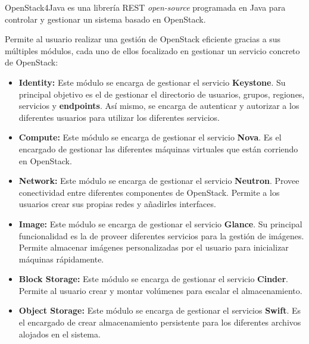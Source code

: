 OpenStack4Java\cite{openstack4jbib} es una librería REST \textit{open-source} programada en Java para controlar y gestionar un sistema basado en OpenStack.

Permite al usuario realizar una gestión de OpenStack eficiente gracias a sus múltiples módulos, cada uno de ellos focalizado en gestionar un servicio concreto de OpenStack:

\begin{itemize}
	\item \textbf{Identity:} Este módulo se encarga de gestionar el servicio \textbf{Keystone}. Su principal objetivo es el de gestionar el directorio de usuarios, grupos, regiones, servicios y \textbf{endpoints}. Así mismo, se encarga de autenticar y autorizar a los diferentes usuarios para utilizar los diferentes servicios.
	
	\item \textbf{Compute:} Este módulo se encarga de gestionar el servicio \textbf{Nova}. Es el encargado de gestionar las diferentes máquinas virtuales que están corriendo en OpenStack.
	
	\item \textbf{Network:} Este módulo se encarga de gestionar el servicio \textbf{Neutron}. Provee conectividad entre diferentes componentes de OpenStack. Permite a los usuarios crear sus propias redes y añadirles interfaces.
	
	\item \textbf{Image:} Este módulo se encarga de gestionar el servicio \textbf{Glance}. Su principal funcionalidad es la de proveer diferentes servicios para la gestión de imágenes. Permite almacenar imágenes personalizadas por el usuario para inicializar máquinas rápidamente.
	
	\item \textbf{Block Storage:} Este módulo se encarga de gestionar el servicio \textbf{Cinder}. Permite al usuario crear y montar volúmenes para escalar el almacenamiento.
	
	\item \textbf{Object Storage:} Este módulo se encarga de gestionar el servicios \textbf{Swift}. Es el encargado de crear almacenamiento persistente para los diferentes archivos alojados en el sistema.
\end{itemize}


